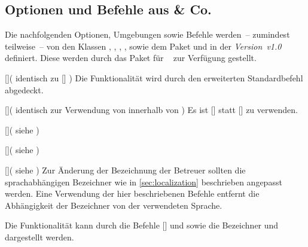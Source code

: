 \begin{Entity*}{}
\subsection{Optionen und Befehle aus  \& Co.}
%
Die nachfolgenden Optionen, Umgebungen sowie Befehle werden~-- zumindest 
teilweise~-- von den Klassen , , 
, ,  sowie dem Paket 
 und \TUDScript in der \emph{Version~v1.0} definiert. Diese 
werden durch das Paket  für \TUDScript~\vTUDScript{} zur 
Verfügung gestellt.

\begin{Declaration}{[]}(%
  identisch zu []%
)
\printdeclarationlist%
%
Die Funktionalität wird durch den erweiterten Standardbefehl  
abgedeckt.
\end{Declaration}

\begin{Declaration}{[]}(%
  identisch zur Verwendung von  innerhalb von %
)
\printdeclarationlist%
%
Es ist []
statt [] zu verwenden.
\end{Declaration}

\begin{Declaration}{[]}(%
  siehe %
)
\begin{Declaration}{[]}(%
  siehe %
)
\begin{Declaration}{[]}(%
  siehe %
)
\printdeclarationlist%
%
Zur Änderung der Bezeichnung der Betreuer sollten die sprachabhängigen 
Bezeichner wie in \autoref{sec:localization} beschrieben angepasst werden. Eine 
Verwendung der hier beschriebenen Befehle entfernt die Abhängigkeit der 
Bezeichner von der verwendeten Sprache.
\end{Declaration}
\end{Declaration}
\end{Declaration}

\begin{Declaration}{}
\printdeclarationlist%
%
Die Funktionalität kann durch die Befehle [] und 
 sowie die Bezeichner  und 
 dargestellt werden.
\end{Declaration}


\end{Entity*}
